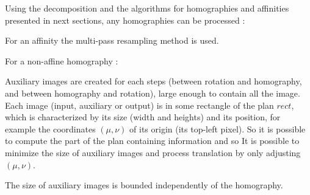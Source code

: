  Using the decomposition and the algorithms for homographies and affinities presented in next sections, any homographies can be processed :
 
 
 For an affinity the multi-pass resampling method is used.
 
 For a non-affine homography :
 
 Auxiliary images are created for each steps (between rotation and homography, and between homography and rotation), large enough to contain all the image. Each image (input, auxiliary or output) is in some rectangle of the plan $rect$, which is characterized by its size (width and heights) and its position, for example the coordinates $(\mu,\nu)$ of its origin (its top-left pixel). So it is possible to compute the part of the plan containing information and so It is possible to minimize the size of auxiliary images and process translation by only adjusting $(\mu,\nu)$.
 
 \begin{prop}
 The size of auxiliary images is bounded independently of the homography.
 \end{prop}
 
 
 
